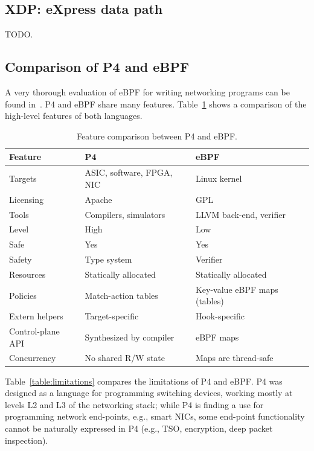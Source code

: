 \subsection{XDP: eXpress data path}

TODO.

\subsection{Comparison of P4 and eBPF}

A very thorough evaluation of eBPF for writing networking programs can
be found in~\cite{minao-hspr18}.  P4 and eBPF share many features.
Table~\ref{table:compare} shows a comparison of the high-level
features of both languages.

\begin{table}[h]
  \footnotesize
  \begin{center}
  \begin{tabular}{|l|l|l|} \hline
    \textbf{Feature} & \textbf{P4} & \textbf{eBPF} \\ \hline \hline
    Targets & ASIC, software, FPGA, NIC & Linux kernel \\ \hline
    Licensing & Apache & GPL \\ \hline
    Tools & Compilers, simulators & LLVM back-end, verifier \\ \hline
    Level & High & Low \\ \hline
    Safe  & Yes & Yes \\ \hline
    Safety & Type system & Verifier \\ \hline
    Resources & Statically allocated & Statically allocated \\ \hline
    Policies & Match-action tables & Key-value eBPF maps (tables) \\ \hline
    Extern helpers & Target-specific & Hook-specific \\ \hline
    Control-plane API & Synthesized by compiler & eBPF maps \\ \hline
    Concurrency & No shared R/W state & Maps are thread-safe \\ \hline
  \end{tabular}
  \caption{Feature comparison between P4 and eBPF.}\label{table:compare}
  \end{center}
\end{table}

Table~\ref{table:limitations} compares the limitations of P4 and eBPF.
P4 was designed as a language for programming switching devices,
working mostly at levels L2 and L3 of the networking stack; while P4
is finding a use for programming network end-points, e.g., smart NICs,
some end-point functionality cannot be naturally expressed in P4
(e.g., TSO, encryption, deep packet inspection).

